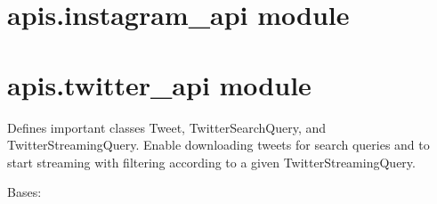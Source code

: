 \documentclass[letterpaper,10pt,english]{sphinxmanual}
\begin{document}

\begin{fulllineitems}
\label{apis:apis.flickr_api.print_places}
\end{fulllineitems}


\begin{fulllineitems}
\label{apis:apis.flickr_api.retrieve_place_name}
\end{fulllineitems}



\section{apis.instagram\_api module}
\label{apis:apis-instagram-api-module}\label{apis:module-apis.instagram_api}

\section{apis.twitter\_api module}
\label{apis:module-apis.twitter_api}\label{apis:apis-twitter-api-module}
Defines important classes Tweet, TwitterSearchQuery, and TwitterStreamingQuery. Enable downloading tweets for search queries and to start streaming with filtering according to a given TwitterStreamingQuery.

\begin{fulllineitems}
\label{apis:apis.twitter_api.PrintingListener}
Bases: {\hyperref[apis:apis.twitter_api.TwitterStreamListener]{\emph{}}}

\begin{fulllineitems}
\label{apis:apis.twitter_api.PrintingListener.on_status}
\end{fulllineitems}


\end{fulllineitems}
\end{document}
